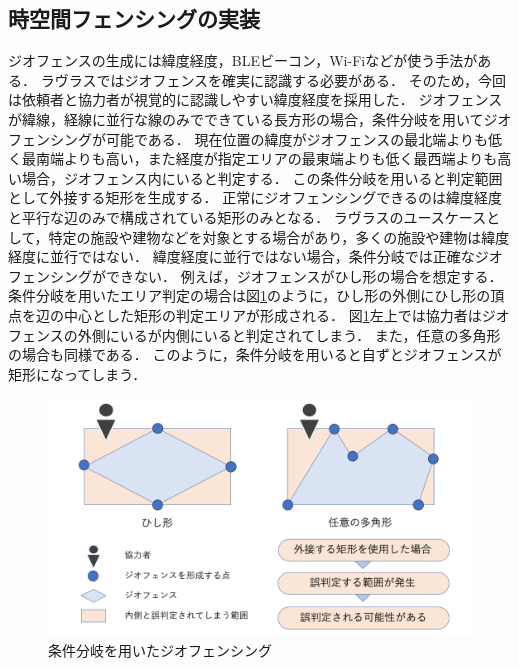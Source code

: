 \subsection{時空間フェンシングの実装}
\label{myApp_STF}
ジオフェンスの生成には緯度経度，BLEビーコン，Wi-Fiなどが使う手法がある．
ラヴラスではジオフェンスを確実に認識する必要がある．
そのため，今回は依頼者と協力者が視覚的に認識しやすい緯度経度を採用した．
ジオフェンスが緯線，経線に並行な線のみでできている長方形の場合，条件分岐を用いてジオフェンシングが可能である．
現在位置の緯度がジオフェンスの最北端よりも低く最南端よりも高い，また経度が指定エリアの最東端よりも低く最西端よりも高い場合，ジオフェンス内にいると判定する．
この条件分岐を用いると判定範囲として外接する矩形を生成する．
正常にジオフェンシングできるのは緯度経度と平行な辺のみで構成されている矩形のみとなる．
ラヴラスのユースケースとして，特定の施設や建物などを対象とする場合があり，多くの施設や建物は緯度経度に並行ではない．
緯度経度に並行ではない場合，条件分岐では正確なジオフェンシングができない．
例えば，ジオフェンスがひし形の場合を想定する．
条件分岐を用いたエリア判定の場合は図\ref{fig:polygon_1}のように，ひし形の外側にひし形の頂点を辺の中心とした矩形の判定エリアが形成される．
図\ref{fig:polygon_1}左上では協力者はジオフェンスの外側にいるが内側にいると判定されてしまう．
また，任意の多角形の場合も同様である．
このように，条件分岐を用いると自ずとジオフェンスが矩形になってしまう．

\begin{figure}[tbh]
    \centering
    \includegraphics[width=16cm]{img_polygon_1.png}
    \caption{条件分岐を用いたジオフェンシング}
    \label{fig:polygon_1}
\end{figure}

